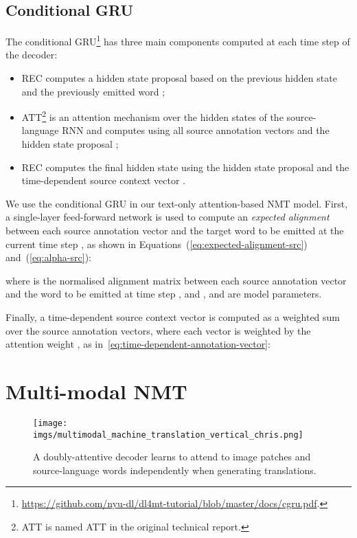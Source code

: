 \documentclass[11pt]{article}
\begin{document}
\subsection{Conditional GRU}
\label{sec:sentence_context}

The conditional GRU\footnote{\url{https://github.com/nyu-dl/dl4mt-tutorial/blob/master/docs/cgru.pdf}.} has three main components computed at each time step  of the decoder:
\begin{itemize}
  \setlength\itemsep{0em}
  \item REC computes a hidden state proposal  based on the previous hidden state  and the previously emitted word ;
  
  \item ATT\footnote{ATT is named ATT in the original technical report.} is an attention mechanism over the hidden states of the source-language RNN and computes  using all source annotation vectors  and the hidden state proposal ;
  
  \item REC computes the final hidden state  using the hidden state proposal  and the time-dependent source context vector .
\end{itemize}

We use the conditional GRU in our text-only attention-based NMT model.
First, a single-layer feed-forward network is used to compute an \emph{expected alignment}  between each source annotation vector  and the target word  to be emitted at the current time step , as shown in Equations~(\ref{eq:expected-alignment-src}) and~(\ref{eq:alpha-src}):

\noindent
where  is the normalised alignment matrix between each source annotation vector  and the word  to be emitted at time step , and ,  and  are model parameters.

Finally, a time-dependent source context vector  is computed as a weighted sum over the source annotation vectors, where each vector is weighted by the attention weight , as in~\cref{eq:time-dependent-annotation-vector}:




\section{Multi-modal NMT}
\label{sec:multimodal-model}

\begin{figure}[t!]
 \centering
 \texttt{[image: imgs/multimodal\_machine\_translation\_vertical\_chris.png]}
\caption{
 A doubly-attentive decoder learns to attend to image patches and source-language words independently when generating translations.
 }
 \label{fig:separate-doubly-attentive}
\end{figure}
\end{document}
